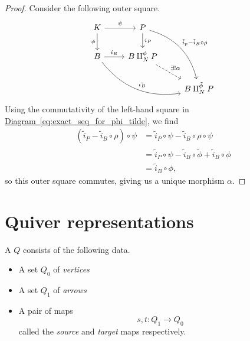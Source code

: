 \documentclass[main.tex]{subfiles}
\begin{document}
\begin{proof}
  Consider the following outer square.
  \begin{equation*}
    \begin{tikzcd}
      K
      \arrow[r, "\psi"]
      \arrow[d, swap, "\phi"]
      & P
      \arrow[ddr, bend left, "\tilde{i}_{p} - \tilde{i}_{B} \circ \rho"]
      \arrow[d, "i_{P}"]
      \\
      B 
      \arrow[r, "i_{B}"]
      \arrow[rrd, bend right, "\tilde{\iota_{B}}"]
      & B \amalg_{N}^{\phi} P
      \arrow[dr, dashed, "\exists!\alpha"]
      \\
      && B \amalg_{N}^{\tilde{\phi}} P
    \end{tikzcd}
  \end{equation*}
  Using the commutativity of the left-hand square in \hyperref[eq:exact_seq_for_phi_tilde]{Diagram~\ref*{eq:exact_seq_for_phi_tilde}}, we find
  \begin{align*}
    (\tilde{i}_{P} - \tilde{i}_{B} \circ \rho) \circ \psi &=\tilde{i}_{P} \circ \psi - \tilde{i}_{B} \circ \rho \circ \psi \\
    &= \tilde{i}_{P} \circ \psi - \tilde{i}_{B} \circ \tilde{\phi} + \tilde{i}_{B} \circ \phi \\
    &= \tilde{i}_{B} \circ \phi,
  \end{align*}
  so this outer square commutes, giving us a unique morphism $\alpha$.
\end{proof}

\section{Quiver representations}
\label{sec:quiver_representations}

\begin{definition}[quiver]
  \label{def:quiver}
  A  $Q$ consists of the following data.
  \begin{itemize}
    \item A set $Q_{0}$ of \emph{vertices}

    \item A set $Q_{1}$ of \emph{arrows}

    \item A pair of maps
      \begin{equation*}
        s, t\colon Q_{1} \to Q_{0}
      \end{equation*}
      called the \emph{source} and \emph{target} maps respectively.
  \end{itemize}
\end{definition}
\end{document}
